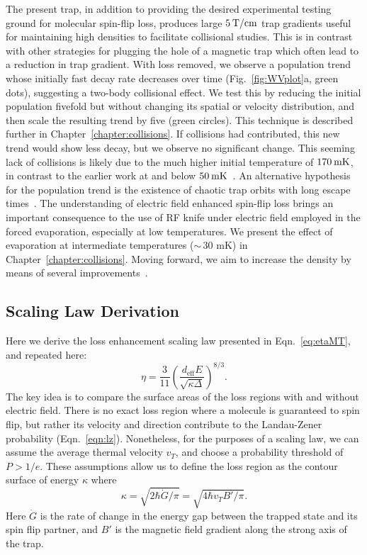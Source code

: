 \documentclass[defaultstyle,11pt]{thesis}
\begin{document}
The present trap, in addition to providing the desired experimental testing ground for molecular spin-flip loss, produces large $5{\nobreak\hspace{.2em}}\text{T/cm}$ trap gradients useful for maintaining high densities to facilitate collisional studies.
This is in contrast with other strategies for plugging the hole of a magnetic trap which often lead to a reduction in trap gradient.
With loss removed, we observe a population trend whose initially fast decay rate decreases over time (Fig.~\ref{fig:WVplot}a, green dots), suggesting a two-body collisional effect.
We test this by reducing the initial population fivefold but without changing its spatial or velocity distribution, and then scale the resulting trend by five (green circles).
This technique is described further in Chapter~\ref{chapter:collisions}.
If collisions had contributed, this new trend would show less decay, but we observe no significant change.
This seeming lack of collisions is likely due to the much higher initial temperature of $170{\nobreak\hspace{.2em}}\text{mK}$, in contrast to the earlier work at and below $50{\nobreak\hspace{.2em}}\text{mK}$~\cite{Stuhl2012evap}. An alternative hypothesis for the population trend is the existence of chaotic trap orbits with long escape times~\cite{Gonzalez-Ferez2014}.  The understanding of electric field enhanced spin-flip loss brings an important consequence to the use of RF knife under electric field employed in the forced evaporation, especially at low temperatures. We present the effect of evaporation at intermediate temperatures (${\sim}\,30\text{ mK}$) in Chapter~\ref{chapter:collisions}.  Moving forward, we aim to increase the density by means of several improvements~\cite{Even2015,Segev2017}.

\subsection{Scaling Law Derivation\label{sec:der}}

Here we derive the loss enhancement scaling law presented in Eqn.~\ref{eq:etaMT}, and repeated here:
\begin{equation}
\eta=\frac{3}{11} \left(\frac{d_\text{eff}E}{\sqrt{\kappa\Delta}}\right)^{8/3}.
\end{equation}
The key idea is to compare the surface areas of the loss regions with and without electric field.
There is no exact loss region where a molecule is guaranteed to spin flip, but rather its velocity and direction contribute to the Landau-Zener probability (Eqn.~\ref{eqn:lz}).
Nonetheless, for the purposes of a scaling law, we can assume the average thermal velocity $v_T$, and choose a probability threshold of $P>1/e$.
These assumptions allow us to define the loss region as the contour surface of energy $\kappa$ where
\begin{equation}
\kappa=\sqrt{2\hbar\dot{G}/\pi}=\sqrt{4\hbar v_T B'/\pi}.
\end{equation}
Here $\dot{G}$ is the rate of change in the energy gap between the trapped state and its spin flip partner, and $B'$ is the magnetic field gradient along the strong axis of the trap.
\end{document}

